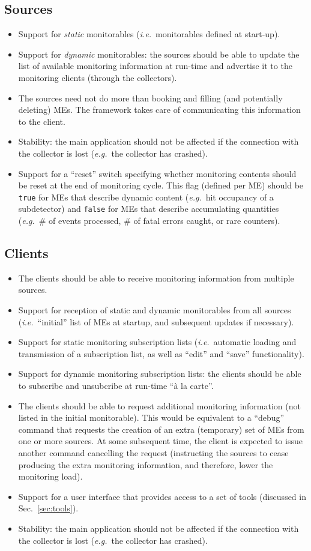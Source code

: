 \documentclass{cmspaper}
\newcommand {\ie}{\mbox{\sl i.e. }}     %
\newcommand {\eg}{\mbox{\sl e.g. }}     %
\begin{document}
\subsection{Sources}
\label{sec:req_sources}
\begin{itemize}
\item{Support for \emph{static} monitorables (\ie monitorables defined
at start-up).}
\item{Support for \emph{dynamic} monitorables: the sources should be able to
update the list of available monitoring information at run-time and
advertise it to the monitoring clients (through the collectors).}
\item{The sources need not do more than booking and filling (and potentially
deleting) MEs. The framework takes care of
communicating this information to the client.}
\item{Stability: the main application should not be affected if the connection
with the collector is lost (\eg the collector has crashed).}
\item{Support for a ``reset'' switch specifying whether monitoring
contents should be reset at the end of monitoring cycle. This flag (defined per
ME) should be {\tt true} for MEs that describe dynamic content (\eg hit
occupancy of a subdetector) and {\tt false} for MEs that describe
accumulating quantities (\eg \# of events processed, \# of fatal
errors caught, or rare counters).}
\end{itemize}
%
%
\subsection{Clients}
\label{sec:req_clients}
\begin{itemize}
\item{The clients should be able to receive monitoring information
from multiple sources.} 
\item{Support for reception of static and dynamic monitorables from all
sources (\ie ``initial'' list of MEs at startup, and
subsequent updates if necessary).}
\item{Support for static monitoring subscription lists (\ie automatic
loading and transmission of a subscription list, as well as ``edit''
and ``save'' functionality).}
\item{Support for dynamic monitoring subscription lists: the clients
should be able to subscribe and unsubcribe at run-time ``\`a la carte''.}
\item{The clients should be able to request additional monitoring
information (not listed in the initial monitorable). This would be
equivalent to a ``debug'' command that requests the creation of an
extra (temporary) set of MEs from one or more
sources. At some subsequent time, the client is expected to issue
another command cancelling the request (instructing the sources to
cease producing the extra monitoring information, and therefore, lower
the monitoring load).} 
\item{Support for a user interface that provides access to a set of
tools (discussed in Sec.~\ref{sec:tools}).}
\item{Stability: the main application should not be affected if the connection
with the collector is lost (\eg the collector has crashed).}
\end{itemize}
%
%
\end{document}
